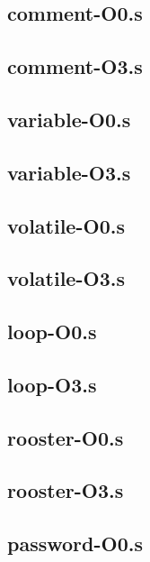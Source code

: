 \begin{appendices}
\subsection{comment-O0.s}

\subsection{comment-O3.s}


\subsection{variable-O0.s}

\subsection{variable-O3.s}


\subsection{volatile-O0.s}

\subsection{volatile-O3.s}


\subsection{loop-O0.s}

\subsection{loop-O3.s}


\subsection{rooster-O0.s}

\subsection{rooster-O3.s}


\subsection{password-O0.s}


\end{appendices}
